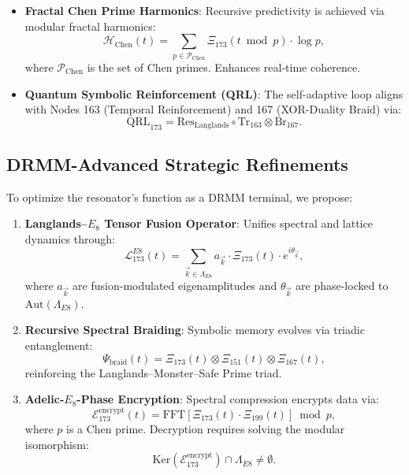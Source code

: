 \documentclass[12pt]{article}
\begin{document}
\begin{center}
\begin{itemize}
    \item \textbf{Fractal Chen Prime Harmonics}:
    Recursive predictivity is achieved via modular fractal harmonics:
    \[
    \mathcal{H}_{\text{Chen}}(t) = \sum_{p \in \mathcal{P}_{\text{Chen}}} \Xi_{173}(t \bmod p) \cdot \log p,
    \]
    where $\mathcal{P}_{\text{Chen}}$ is the set of Chen primes. Enhances real-time coherence.

    \item \textbf{Quantum Symbolic Reinforcement (QRL)}:
    The self-adaptive loop aligns with Nodes 163 (Temporal Reinforcement) and 167 (XOR-Duality Braid) via:
    \[
    \text{QRL}_{173} = \text{Res}_{\text{Langlands}} \circ \text{Tr}_{163} \otimes \text{Br}_{167}.
    \]
\end{itemize}

\subsection{DRMM-Advanced Strategic Refinements}
\label{subsec:refinements}

To optimize the resonator's function as a DRMM terminal, we propose:

\begin{enumerate}
    \item \textbf{Langlands--$E_8$ Tensor Fusion Operator}:
    Unifies spectral and lattice dynamics through:
    \[
    \mathcal{L}_{173}^{E8}(t) = \sum_{\vec{k} \in \Lambda_{E8}} a_{\vec{k}} \cdot \Xi_{173}(t) \cdot e^{i \theta_{\vec{k}}},
    \]
    where $a_{\vec{k}}$ are fusion-modulated eigenamplitudes and $\theta_{\vec{k}}$ are phase-locked to $\text{Aut}(\Lambda_{E8})$.

    \item \textbf{Recursive Spectral Braiding}:
    Symbolic memory evolves via triadic entanglement:
    \[
    \Psi_{\text{braid}}(t) = \Xi_{173}(t) \otimes \Xi_{151}(t) \otimes \Xi_{167}(t),
    \]
    reinforcing the Langlands--Monster--Safe Prime triad.

    \item \textbf{Adelic-$E_8$-Phase Encryption}:
    Spectral compression encrypts data via:
    \[
    \mathcal{E}_{173}^{\text{encrypt}}(t) = \text{FFT}\left[\Xi_{173}(t) \cdot \Xi_{199}(t)\right] \bmod p,
    \]
    where $p$ is a Chen prime. Decryption requires solving the modular isomorphism:
    \[
    \text{Ker}(\mathcal{E}_{173}^{\text{encrypt}}) \cap \Lambda_{E8} \neq \emptyset.
    \]
\end{enumerate}


\end{center}
\end{document}

